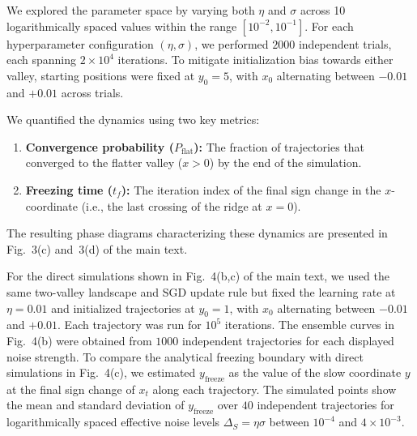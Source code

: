 \documentclass[aps,prx,preprint,superscriptaddress,nofootinbib]{revtex4-2}
\begin{document}
We explored the parameter space by varying both $\eta$ and $\sigma$ across 10 logarithmically spaced values within the range $[10^{-2}, 10^{-1}]$. For each hyperparameter configuration $(\eta, \sigma)$, we performed $2000$ independent trials, each spanning $2\times10^4$ iterations. To mitigate initialization bias towards either valley, starting positions were fixed at $y_0 = 5$, with $x_0$ alternating between $-0.01$ and $+0.01$ across trials.

We quantified the dynamics using two key metrics:
\begin{enumerate}
    \item \textbf{Convergence probability ($P_\mathrm{flat}$):} The fraction of trajectories that converged to the flatter valley ($x > 0$) by the end of the simulation.
    \item \textbf{Freezing time ($t_f$):} The iteration index of the final sign change in the $x$-coordinate (i.e., the last crossing of the ridge at $x=0$).
\end{enumerate}
The resulting phase diagrams characterizing these dynamics are presented in Fig.~3(c) and~3(d) of the main text.

For the direct simulations shown in Fig.~4(b,c) of the main text, we used the same two-valley landscape and SGD update rule but fixed the learning rate at $\eta=0.01$ and initialized trajectories at $y_0=1$, with $x_0$ alternating between $-0.01$ and $+0.01$. Each trajectory was run for $10^5$ iterations. The ensemble curves in Fig.~4(b) were obtained from $1000$ independent trajectories for each displayed noise strength. To compare the analytical freezing boundary with direct simulations in Fig.~4(c), we estimated $y_{\mathrm{freeze}}$ as the value of the slow coordinate $y$ at the final sign change of $x_t$ along each trajectory. The simulated points show the mean and standard deviation of $y_{\mathrm{freeze}}$ over $40$ independent trajectories for logarithmically spaced effective noise levels $\Delta_S=\eta\sigma$ between $10^{-4}$ and $4\times10^{-3}$.


\end{document}
